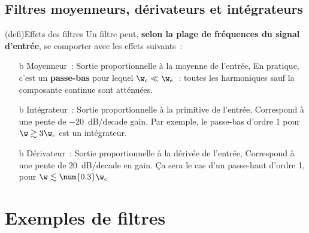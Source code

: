 \documentclass[../../main/main.tex]{subfiles}
\begin{document}
\subsection{Filtres moyenneurs, dérivateurs et intégrateurs}
\begin{tcb*}[breakable](defi){Effets des filtres}
	Un filtre peut, \textbf{selon la plage de fréquences du signal d'entrée}, se
	comporter avec les effets suivants~:
	\begin{itemize}
		\item[b]{Moyenneur}~:
		      Sortie proportionnelle à la moyenne de l'entrée,
		      \psw{%
			      \[
				      \boxed{s(t) = K \moy{e(t)}}
			      \]
		      }%
		      En pratique, c'est un \textbf{passe-bas} pour lequel $\w_c \ll
			      \w_e$~:
		      toutes les harmoniques sauf la composante continue sont atténuées.
		\item[b]{Intégrateur}~:
		      Sortie proportionnelle à la primitive de l'entrée,
		      \psw{%
			      \[
				      \boxed{s(t) = K \int e(t)dt}
				      \Lra
				      \Su = \frac{K}{\jw}\Eu
				      \Lra
				      \boxed{\Hu(\jw) = \frac{K}{\jw}}
			      \]
		      }%
		      Correspond à une pente de \SI{-20}{dB/decade} gain.
		      Par exemple, le passe-bas d'ordre 1 pour $\w \gtrsim 3\w_c$ est un
		      intégrateur.
		\item[b]{Dérivateur}~:
		      Sortie proportionnelle à la dérivée de l'entrée,
		      \psw{%
			      \[
				      \boxed{s(t) = K \dv{e}{t}}
				      \Lra
				      \Su = K\jw \Eu
				      \Lra
				      \boxed{\Hu(\jw) = K \cdot \jw}
			      \]
		      }%
		      Correspond à une pente de \SI{+20}{dB/decade} en gain. Ça sera le
		      cas d'un passe-haut d'ordre 1, pour $\w \lesssim \num{0.3}\w_c$
	\end{itemize}
\end{tcb*}

\vspace{-15pt}
\section{Exemples de filtres}
\end{document}
